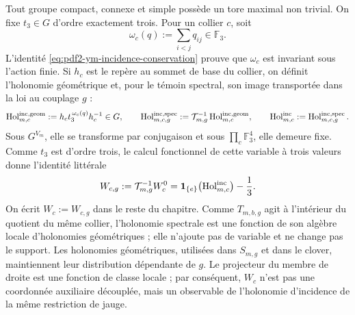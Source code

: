 Tout groupe compact, connexe et simple possède un tore maximal non trivial. On fixe $t_3\in G$ d'ordre exactement trois. Pour un collier $c$, soit
\begin{equation}\label{eq:pdf2-ym-owner-incidence-flux}
 \omega_c(q):=\sum_{i<j}q_{ij}\in\mathbb F_3.
\end{equation}
L’identité \eqref{eq:pdf2-ym-incidence-conservation} prouve que $\omega_c$ est
invariant sous l’action finie. Si $h_c$ est le repère au sommet de base du collier,
on définit l’holonomie géométrique et, pour le témoin spectral, son image transportée
dans la loi au couplage $g$ :
\begin{equation}\label{eq:pdf2-ym-owner-incidence-holonomy}
 \operatorname{Hol}_{m,c}^{\rm inc,geom}:=h_ct_3^{\,\omega_c(q)}h_c^{-1}\in G,
 \qquad
 \operatorname{Hol}_{m,c,g}^{\rm inc,spec}
 :=\mathcal T_{m,g}^{-1}\operatorname{Hol}_{m,c}^{\rm inc,geom},
 \qquad
 \operatorname{Hol}_{m,c}^{\rm inc}:=\operatorname{Hol}_{m,c,g}^{\rm inc,spec}.
\end{equation}
Sous $G^{V_m}$, elle se transforme par conjugaison et sous
$\prod_c\mathbb F_3^4$, elle demeure fixe. Comme $t_3$ est d’ordre trois, le calcul
fonctionnel de cette variable à trois valeurs donne l’identité littérale
\begin{equation}\label{eq:pdf2-ym-owner-wc-curvature-functional}
 W_{c,g}:=\mathcal T_{m,g}^{-1}W_c^0
 =\mathbf1_{\{e\}}\!\left(\operatorname{Hol}_{m,c}^{\rm inc}\right)-\frac13.
\end{equation}
On écrit $W_c:=W_{c,g}$ dans le reste du chapitre. Comme $T_{m,b,g}$ agit à l'intérieur du quotient du même collier, l'holonomie spectrale est une fonction de son algèbre locale d'holonomies géométriques ; elle n'ajoute pas de variable et ne change pas le support. Les holonomies géométriques, utilisées dans $S_{m,g}$ et dans le clover, maintiennent leur distribution dépendante de $g$.
Le projecteur du membre de droite est une fonction de classe locale ; par conséquent, $W_c$ n'est pas une coordonnée auxiliaire découplée, mais un observable de l'holonomie d'incidence de la même restriction de jauge.


